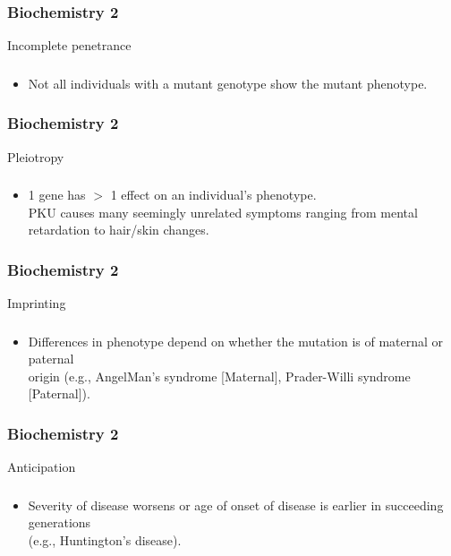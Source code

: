 \documentclass[11pt]{beamer}
\begin{document}
\begin{frame}
 \frametitle{Biochemistry 2}
Incomplete penetrance 
\end{frame}

\begin{frame}
 \frametitle{}
\begin{itemize}
\item Not all individuals with a mutant genotype show the mutant phenotype.
\end{itemize}
\end{frame}

\begin{frame}
 \frametitle{Biochemistry 2}
Pleiotropy
\end{frame}

\begin{frame}
 \frametitle{}
\begin{itemize}
\item 1 gene has $>$ 1 effect on an individual’s phenotype. \\ PKU causes many seemingly unrelated symptoms ranging from mental retardation to hair/skin changes. 
\end{itemize}
\end{frame}

\begin{frame}
 \frametitle{Biochemistry 2}
Imprinting
\end{frame}

\begin{frame}
 \frametitle{}
\begin{itemize}
\item Differences in phenotype depend on whether the mutation is of maternal or paternal \\ origin (e.g., AngelMan’s syndrome [Maternal], Prader-Willi syndrome [Paternal]).
\end{itemize}
\end{frame}

\begin{frame}
 \frametitle{Biochemistry 2}
Anticipation
\end{frame}

\begin{frame}
 \frametitle{}
\begin{itemize}
\item Severity of disease worsens or age of onset of disease is earlier in succeeding generations \\ (e.g., Huntington’s disease).
\end{itemize}
\end{frame}
\end{document}

